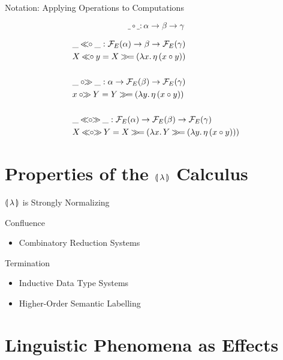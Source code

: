 \documentclass{beamer}
\begin{document}
\begin{frame}{Notation: Applying Operations to Computations}

  $$
  \_ \circ \_ : \alpha \to \beta \to \gamma
  $$
  
  \begin{align*}
  &\_ \opl{\circ} \_ : \FF_E(\alpha) \to \beta \to \FF_E(\gamma) \\
  &X \opl{\circ} y = X \hsbind (\lam{x}{\ap{\eta}{(x \circ y)}}) \\
  \\
  &\_ \opr{\circ} \_ : \alpha \to \FF_E(\beta) \to \FF_E(\gamma) \\
  &x \opr{\circ} Y = Y \hsbind (\lam{y}{\ap{\eta}{(x \circ y)}}) \\
  \\
  &\_ \oplr{\circ} \_ : \FF_E(\alpha) \to \FF_E(\beta) \to \FF_E(\gamma) \\
  &X \oplr{\circ} Y = X \hsbind (\lam{x}{Y \hsbind (\lam{y}{\ap{\eta}{(x \circ y)}})})
  \end{align*}
\end{frame}



\section{Properties of the \texorpdfstring{${\llparenthesis \, \lambda \, \rrparenthesis}$}{} Calculus}

\begin{frame}{${\llparenthesis \, \lambda \, \rrparenthesis}$ is Strongly Normalizing}

  \begin{block}{Confluence}
  \begin{itemize}
  \item Combinatory Reduction Systems \cite{klop1993combinatory}
  \end{itemize}
  \end{block}

  \begin{block}{Termination}
  \begin{itemize}
  \item Inductive Data Type Systems \cite{blanqui2000termination}
  \item Higher-Order Semantic Labelling \cite{hamana2007higher}
  \end{itemize}
  \end{block}
\end{frame}



\section{Linguistic Phenomena as Effects}
\end{document}
